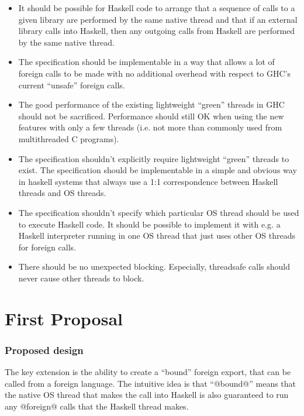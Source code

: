 \documentclass{article}
\begin{document}
\begin{itemize}
\item It should be possible for Haskell code to arrange that a sequence of
calls to a given library are performed by the same native thread and
that if an external library calls into Haskell, then any outgoing calls
from Haskell are performed by the same native thread.

\item The specification should be implementable in a way that allows a lot
of foreign calls to be made with no additional overhead with respect to
GHC's current ``unsafe'' foreign calls.

\item The good performance of the existing lightweight ``green'' threads in
GHC should not be sacrificed. Performance should still OK when using
the new features with only a few threads (i.e. not more than commonly
used from multithreaded C programs).

\item The specification shouldn't explicitly require lightweight ``green''
threads to exist. The specification should be implementable in a simple
and obvious way in haskell systems that always use a 1:1 correspondence
between Haskell threads and OS threads.

\item The specification shouldn't specify which particular OS thread
should be used to execute Haskell code. It should be possible to
implement it with e.g. a Haskell interpreter running in one OS thread
that just uses other OS threads for foreign calls.

\item There should be no unexpected blocking. Especially, threadsafe calls
should never cause other threads to block.
\end{itemize}

\newpage
\part{First Proposal}
\section{Proposed design}

The key extension is the ability to create a ``bound'' foreign export,
that can be called from a foreign language.
The intuitive idea is that ``@bound@'' means that the native OS thread that makes
the call into Haskell is also guaranteed to run any @foreign@ calls that the
Haskell thread makes.  
\end{document}
